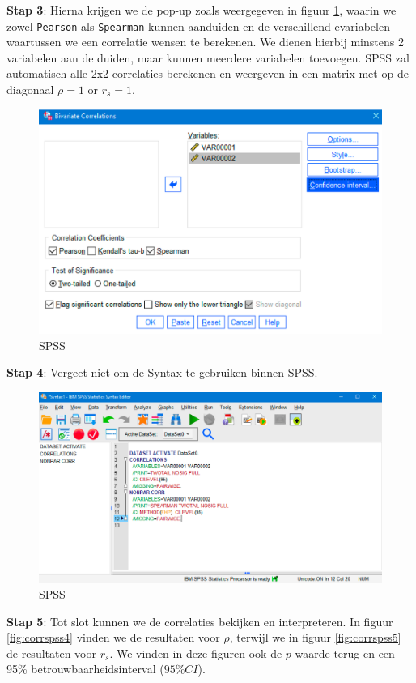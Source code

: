 \documentclass[
]{book}
\theoremstyle{definition}
\theoremstyle{definition}
\theoremstyle{definition}
\theoremstyle{definition}
\theoremstyle{remark}
\begin{document}
\textbf{Stap 3}: Hierna krijgen we de pop-up zoals weergegeven in figuur \ref{fig:corrspss2}, waarin we zowel \texttt{Pearson} als \texttt{Spearman} kunnen aanduiden en de verschillend evariabelen waartussen we een correlatie wensen te berekenen. We dienen hierbij minstens 2 variabelen aan de duiden, maar kunnen meerdere variabelen toevoegen. {SPSS} zal automatisch alle 2x2 correlaties berekenen en weergeven in een matrix met op de diagonaal \(\rho = 1\) or \(r_s = 1\).

\begin{figure}
\includegraphics[width=0.75\linewidth]{img/spss_corr_2} \caption{SPSS}\label{fig:corrspss2}
\end{figure}

\textbf{Stap 4}: Vergeet niet om de Syntax te gebruiken binnen {SPSS}.

\begin{figure}
\includegraphics[width=0.75\linewidth]{img/spss_corr_3} \caption{SPSS}\label{fig:corrspss3}
\end{figure}

\textbf{Stap 5}: Tot slot kunnen we de correlaties bekijken en interpreteren. In figuur \ref{fig:corrspss4} vinden we de resultaten voor \(\rho\), terwijl we in figuur \ref{fig:corrspss5} de resultaten voor \(r_s\). We vinden in deze figuren ook de \(p\)-waarde terug en een 95\% betrouwbaarheidsinterval (\(95\% CI\)).
\end{document}
